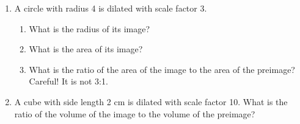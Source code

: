 \begin{enumerate}
    \item A circle with radius 4 is dilated with scale factor 3.
        \begin{enumerate}
            \item What is the radius of its image?\wbvfill
            \item What is the area of its image?\wbvfill
            \item What is the ratio of the area of the image to the area of the preimage? Careful! It is not 3:1.\wbvfill
        \end{enumerate}
    \item A cube with side length 2 cm is dilated with scale factor 10. What is the ratio of the volume of the image to the volume of the preimage?\wbvfill
\end{enumerate}

\wbnewpage
